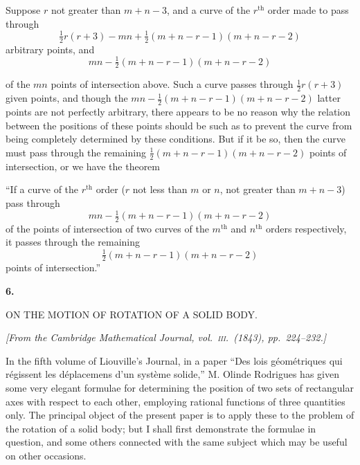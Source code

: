 \documentclass[11pt]{article}
\providecommand{\half}{\tfrac12}
\begin{document}
Suppose $r$ not greater than $m+n-3$, and a curve of the $r^{\text{th}}$ order made
to pass through
\[
\half r(r+3)-mn+\half(m+n-r-1)(m+n-r-2)
\]
arbitrary points, and
\[
mn-\half(m+n-r-1)(m+n-r-2)
\]

\clearpage

\noindent of the $mn$ points of intersection above. Such a curve passes through
$\half r(r+3)$ given points, and though the
$mn-\half(m+n-r-1)(m+n-r-2)$ latter points are not perfectly arbitrary, there appears
to be no reason why the relation between the positions of these points should be such
as to prevent the curve from being completely determined by these conditions. But if
it be so, then the curve must pass through the remaining
$\half(m+n-r-1)(m+n-r-2)$ points of intersection, or we have the theorem

``If a curve of the $r^{\text{th}}$ order ($r$ not less than $m$ or $n$, not greater
than $m+n-3$) pass through
\[
mn-\half(m+n-r-1)(m+n-r-2)
\]
of the points of intersection of two curves of the $m^{\text{th}}$ and $n^{\text{th}}$
orders respectively, it passes through the remaining
\[
\half(m+n-r-1)(m+n-r-2)
\]
points of intersection.''

\clearpage


\begin{center}
{\Large\textbf{6.}}\par
\bigskip
{\Large ON THE MOTION OF ROTATION OF A SOLID BODY.}
\end{center}

\medskip
\begin{center}
\textit{[From the Cambridge Mathematical Journal, vol.\ \textsc{iii}.\ (1843), pp.~224--232.]}
\end{center}

\bigskip

\noindent In the fifth volume of Liouville's Journal, in a paper ``Des lois g\'eom\'etriques qui
r\'egissent les d\'eplacemens d'un syst\`eme solide,'' M. Olinde Rodrigues has given some
very elegant formulae for determining the position of two sets of rectangular axes
with respect to each other, employing rational functions of three quantities only. The
principal object of the present paper is to apply these to the problem of the rotation
of a solid body; but I shall first demonstrate the formulae in question, and some
others connected with the same subject which may be useful on other occasions.
\end{document}
